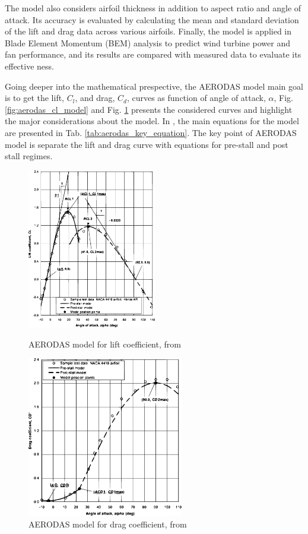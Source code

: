 The model also considers airfoil thickness in addition to aspect ratio and angle of attack. Its accuracy is evaluated by calculating the mean and standard deviation of the lift and drag data across various airfoils. Finally, the model is applied in Blade Element Momentum (BEM) analysis to predict wind turbine power and fan performance, and its results are compared with measured data to evaluate its effective
ness.

Going deeper into the mathematical prespective, the AERODAS model main goal is to get the lift, $C_l$, and drag, $C_d$, curves as function of angle of attack, $\alpha$, Fig. \ref{fig:aerodas_cl_model} and Fig. \ref{fig:aerodas_cd_model} presents the considered curves and highlight the major considerations about the model. In \cite{spera_models_2008}, the main equations for the model are presented in Tab. \ref{tab:aerodas_key_equation}. The key point of AERODAS model is separate the lift and drag curve with equations for pre-stall and post stall regimes.

\begin{figure}[!htb]
	\centering
	\begin{minipage}{0.45\textwidth}
		\centering
		\includegraphics[height=7cm]{Figures/background/aero/liftmodel_aerodas.eps}
		\caption{AERODAS model for lift coefficient, from \cite{spera_models_2008}}
		\label{fig:aerodas_cl_model}
	\end{minipage}
	\hfill
    \begin{minipage}{0.45\textwidth}
		\centering
		\includegraphics[height=7cm]{Figures/background/aero/dragmodel_aerodas.eps}
		\caption{AERODAS model for drag coefficient, from \cite{spera_models_2008}}
		\label{fig:aerodas_cd_model}
	\end{minipage}
\end{figure}

